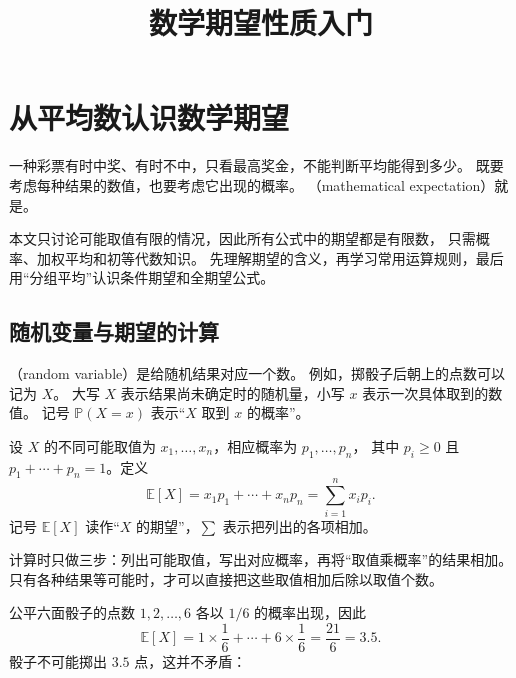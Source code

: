 \documentclass[UTF8]{ctexart}
\title{数学期望性质入门}
\author{}
\date{}
\begin{document}
\maketitle

\section{从平均数认识数学期望}
\label{sec:basic-expectation-introduction}

一种彩票有时中奖、有时不中，只看最高奖金，不能判断平均能得到多少。
既要考虑每种结果的数值，也要考虑它出现的概率。
（mathematical expectation）就是。

本文只讨论可能取值有限的情况，因此所有公式中的期望都是有限数，
只需概率、加权平均和初等代数知识。
先理解期望的含义，再学习常用运算规则，最后用“分组平均”认识条件期望和全期望公式。

\subsection{随机变量与期望的计算}

（random variable）是给随机结果对应一个数。
例如，掷骰子后朝上的点数可以记为 $X$。
大写 $X$ 表示结果尚未确定时的随机量，小写 $x$ 表示一次具体取到的数值。
记号 $\mathbb P(X=x)$ 表示“$X$ 取到 $x$ 的概率”。

\begin{definition}[有限个取值时的数学期望]
设 $X$ 的不同可能取值为 $x_1,\ldots,x_n$，相应概率为 $p_1,\ldots,p_n$，
其中 $p_i\geq0$ 且 $p_1+\cdots+p_n=1$。定义
\begin{equation}
  \mathbb E[X]=x_1p_1+\cdots+x_np_n
  =\sum_{i=1}^{n}x_ip_i.
  \label{eq:basic-expectation-definition}
\end{equation}
记号 $\mathbb E[X]$ 读作“$X$ 的期望”，$\sum$ 表示把列出的各项相加。
\end{definition}

计算时只做三步：列出可能取值，写出对应概率，再将“取值乘概率”的结果相加。
只有各种结果等可能时，才可以直接把这些取值相加后除以取值个数。

\begin{example}[公平骰子的点数]
公平六面骰子的点数 $1,2,\ldots,6$ 各以 $1/6$ 的概率出现，因此
\[
  \mathbb E[X]
  =1\times\frac16+\cdots+6\times\frac16
  =\frac{21}{6}=3.5.
\]
骰子不可能掷出 $3.5$ 点，这并不矛盾：
\end{example}
\end{document}
